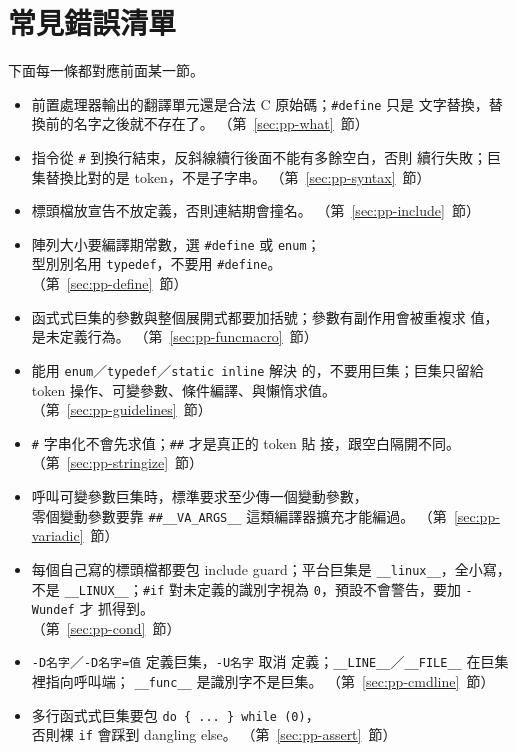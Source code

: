 \section{常見錯誤清單}
\label{sec:pp-checklist}

下面每一條都對應前面某一節。

\begin{itemize}
\item 前置處理器輸出的翻譯單元還是合法 C 原始碼；\texttt{\#define} 只是
文字替換，替換前的名字之後就不存在了。
（第~\ref{sec:pp-what}~節）
\item 指令從 \texttt{\#} 到換行結束，反斜線續行後面不能有多餘空白，否則
續行失敗；巨集替換比對的是 token，不是子字串。
（第~\ref{sec:pp-syntax}~節）
\item 標頭檔放宣告不放定義，否則連結期會撞名。
（第~\ref{sec:pp-include}~節）
\item 陣列大小要編譯期常數，選 \texttt{\#define} 或 \texttt{enum}；\\
型別別名用 \texttt{typedef}，不要用 \texttt{\#define}。\\
（第~\ref{sec:pp-define}~節）
\item 函式式巨集的參數與整個展開式都要加括號；參數有副作用會被重複求
值，是未定義行為。
（第~\ref{sec:pp-funcmacro}~節）
\item 能用 \texttt{enum}／\texttt{typedef}／\texttt{static inline} 解決
的，不要用巨集；巨集只留給 token 操作、可變參數、條件編譯、與懶惰求值。\\
（第~\ref{sec:pp-guidelines}~節）
\item \texttt{\#} 字串化不會先求值；\texttt{\#\#} 才是真正的 token 貼
接，跟空白隔開不同。
（第~\ref{sec:pp-stringize}~節）
\item 呼叫可變參數巨集時，標準要求至少傳一個變動參數，\\
零個變動參數要靠 \texttt{\#\#\_\_VA\_ARGS\_\_} 這類編譯器擴充才能編過。
（第~\ref{sec:pp-variadic}~節）
\item 每個自己寫的標頭檔都要包 include guard；平台巨集是
\texttt{\_\_linux\_\_}，全小寫，不是 \texttt{\_\_LINUX\_\_}；\texttt{\#if}
對未定義的識別字視為 \texttt{0}，預設不會警告，要加 \texttt{-Wundef} 才
抓得到。\\
（第~\ref{sec:pp-cond}~節）
\item \texttt{-D名字}／\texttt{-D名字=值} 定義巨集，\texttt{-U名字} 取消
定義；\texttt{\_\_LINE\_\_}／\texttt{\_\_FILE\_\_} 在巨集裡指向呼叫端；
\texttt{\_\_func\_\_} 是識別字不是巨集。
（第~\ref{sec:pp-cmdline}~節）
\item 多行函式式巨集要包 \texttt{do \{ ... \} while (0)}，\\
否則裸 \texttt{if} 會踩到 dangling else。
（第~\ref{sec:pp-assert}~節）
\end{itemize}

